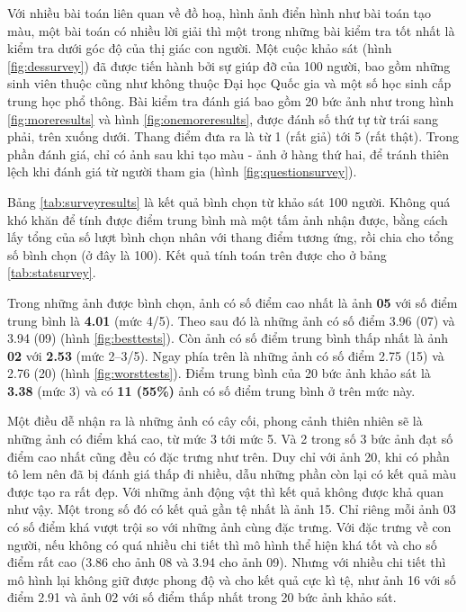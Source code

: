 \documentclass[a4paper, 12pt]{report}
\begin{document}
Với nhiều bài toán liên quan về đồ hoạ, hình ảnh điển hình như bài toán tạo màu, một bài toán có nhiều lời giải thì một trong những bài kiểm tra tốt nhất là kiểm tra dưới góc độ của thị giác con người.
Một cuộc khảo sát (hình \ref{fig:dessurvey}) đã được tiến hành bởi sự giúp đỡ của 100 người, bao gồm những sinh viên thuộc cũng như không thuộc Đại học Quốc gia và một số học sinh cấp trung học phổ thông.
Bài kiểm tra đánh giá bao gồm 20 bức ảnh như trong hình \ref{fig:moreresults} và hình \ref{fig:onemoreresults}, được đánh số thứ tự từ trái sang phải, trên xuống dưới.
Thang điểm đưa ra là từ 1 (rất giả) tới 5 (rất thật).
Trong phần đánh giá, chỉ có ảnh sau khi tạo màu - ảnh ở hàng thứ hai, để tránh thiên lệch khi đánh giá từ người tham gia (hình \ref{fig:questionsurvey}).\vspace{5pt}

Bảng \ref{tab:surveyresults} là kết quả bình chọn từ khảo sát 100 người.
Không quá khó khăn để tính được điểm trung bình mà một tấm ảnh nhận được, bằng cách lấy tổng của số lượt bình chọn nhân với thang điểm tương ứng, rồi chia cho tổng số bình chọn (ở đây là 100).
Kết quả tính toán trên được cho ở bảng \ref{tab:statsurvey}.\vspace{5pt}

Trong những ảnh được bình chọn, ảnh có số điểm cao nhất là ảnh \textbf{05} với số điểm trung bình là \textbf{4.01} (mức 4/5).
Theo sau đó là những ảnh có số điểm 3.96 (07) và 3.94 (09) (hình \ref{fig:besttests}).
Còn ảnh có số điểm trung bình thấp nhất là ảnh \textbf{02} với \textbf{2.53} (mức 2--3/5).
Ngay phía trên là những ảnh có số điểm 2.75 (15) và 2.76 (20) (hình \ref{fig:worsttests}).
Điểm trung bình của 20 bức ảnh khảo sát là \textbf{3.38} (mức 3) và có \textbf{11 (55\%)} ảnh có số điểm trung bình ở trên mức này.\vspace{5pt}

Một điều dễ nhận ra là những ảnh có cây cối, phong cảnh thiên nhiên sẽ là những ảnh có điểm khá cao, từ mức 3 tới mức 5.
Và 2 trong số 3 bức ảnh đạt số điểm cao nhất cũng đều có đặc trưng như trên.
Duy chỉ với ảnh 20, khi có phần tô lem nên đã bị đánh giá thấp đi nhiều, dẫu những phần còn lại có kết quả màu được tạo ra rất đẹp.
Với những ảnh động vật thì kết quả không được khả quan như vậy.
Một trong số đó có kết quả gần tệ nhất là ảnh 15.
Chỉ riêng mỗi ảnh 03 có số điểm khá vượt trội so với những ảnh cùng đặc trưng.
Với đặc trưng về con người, nếu không có quá nhiều chi tiết thì mô hình thể hiện khá tốt và cho số điểm rất cao (3.86 cho ảnh 08 và 3.94 cho ảnh 09).
Nhưng với nhiều chi tiết thì mô hình lại không giữ được phong độ và cho kết quả cực kì tệ, như ảnh 16 với số điểm 2.91 và ảnh 02 với số điểm thấp nhất trong 20 bức ảnh khảo sát.
\end{document}

